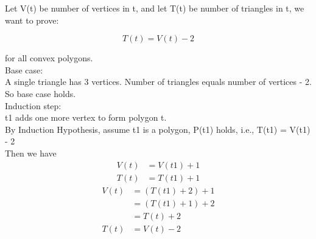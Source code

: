 \documentclass[12pt]{article}
\begin{document}
          Let V(t) be number of vertices in t, and let T(t) be number of triangles in t, we want to prove:
          
          \[ T(t) = V(t) - 2\]
          
          for all convex polygons.\\
          
          Base case:\\
          A single triangle has 3 vertices. Number of triangles equals number of vertices - 2. So base case holds.\\
          
          Induction step:\\
          t1 adds one more vertex to form polygon t.\\
          By Induction Hypothesis, assume t1 is a polygon, P(t1) holds, i.e., T(t1) = V(t1) - 2\\
          Then we have\\
          \begin{align*}
                        V(t) &= V(t1) + 1 \\
                        T(t) &= T(t1) + 1
         \end{align*}
         \begin{align*}
                    V(t)&= (T(t1) + 2) + 1 \\
                             &= (T(t1) + 1) + 2 \\
                             &= T(t) + 2 \\
                    T(t) &= V(t) - 2
          \end{align*}
\end{document}
